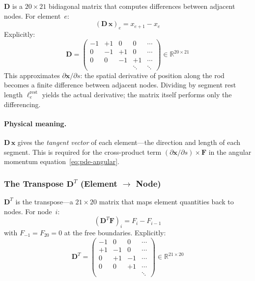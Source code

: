 \documentclass[11pt]{article}
\begin{document}
$\mathbf{D}$ is a $20 \times 21$ bidiagonal matrix that computes differences between adjacent nodes.
For element~$e$:
\begin{equation}
  (\mathbf{D}\,\mathbf{x})_e = x_{e+1} - x_e
  \label{eq:D-operator}
\end{equation}
Explicitly:
\begin{equation}
  \mathbf{D} =
  \begin{pmatrix}
    -1 & +1 &  0 &  0 & \cdots \\
     0 & -1 & +1 &  0 & \cdots \\
     0 &  0 & -1 & +1 & \cdots \\
       &    &    & \ddots & \ddots
  \end{pmatrix}
  \in \mathbb{R}^{20 \times 21}
  \label{eq:D-matrix}
\end{equation}
This approximates $\partial \mathbf{x}/\partial s$: the spatial derivative of position along the rod becomes a finite difference between adjacent nodes.
Dividing by segment rest length $\ell_e^{\text{rest}}$ yields the actual derivative; the matrix itself performs only the differencing.

\paragraph{Physical meaning.}
$\mathbf{D}\,\mathbf{x}$ gives the \emph{tangent vector} of each element---the direction and length of each segment.
This is required for the cross-product term $(\partial\mathbf{x}/\partial s) \times \mathbf{F}$ in the angular momentum equation~\eqref{eq:pde-angular}.

\subsubsection{The Transpose $\mathbf{D}^T$ (Element $\to$ Node)}

$\mathbf{D}^T$ is the transpose---a $21 \times 20$ matrix that maps element quantities back to nodes.
For node~$i$:
\begin{equation}
  (\mathbf{D}^T \mathbf{F})_i = F_i - F_{i-1}
  \label{eq:DT-operator}
\end{equation}
with $F_{-1} = F_{20} = 0$ at the free boundaries.
Explicitly:
\begin{equation}
  \mathbf{D}^T =
  \begin{pmatrix}
    -1 &  0 &  0 & \cdots \\
    +1 & -1 &  0 & \cdots \\
     0 & +1 & -1 & \cdots \\
     0 &  0 & +1 & \cdots \\
       &    &    & \ddots
  \end{pmatrix}
  \in \mathbb{R}^{21 \times 20}
  \label{eq:DT-matrix}
\end{equation}
\end{document}
